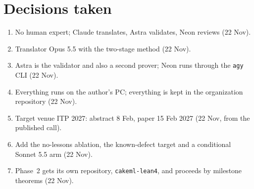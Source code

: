 \documentclass[11pt,a4paper]{article}
\newcommand{\code}[1]{\texttt{#1}}
\begin{document}
\section{Decisions taken}
\begin{enumerate}
\item No human expert; Claude translates, Astra validates, Neon reviews (22 Nov).
\item Translator Opus 5.5 with the two-stage method (22 Nov).
\item Astra is the validator and also a second prover; Neon runs through the \code{agy} CLI (22 Nov).
\item Everything runs on the author's PC; everything is kept in the organization repository (22 Nov).
\item Target venue ITP 2027: abstract 8 Feb, paper 15 Feb 2027 (22 Nov, from the published call).
\item Add the no-lessons ablation, the known-defect target and a conditional Sonnet 5.5 arm (22 Nov).
\item Phase~2 gets its own repository, \code{cakeml-lean4}, and proceeds by milestone theorems (22 Nov).
\end{enumerate}
\end{document}
